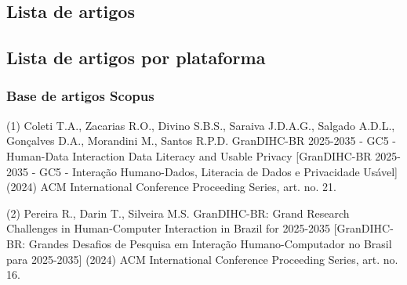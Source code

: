 \documentclass[
	12pt,				%
	oneside,			%
	a4paper,			%
	english,			%
	brazil				%
	]{abntex2ppgsi}
\begin{document}

\begin{apendicesenv}

\partapendices


\chapter{Lista de artigos}\label{Apendice_A}
\section*{Lista de artigos por plataforma}

\subsection{Base de artigos Scopus}\label{list:scopus}

(1) Coleti T.A., Zacarias R.O., Divino S.B.S., Saraiva J.D.A.G., Salgado A.D.L., Gonçalves D.A., Morandini M., Santos R.P.D. GranDIHC-BR 2025-2035 - GC5 - Human-Data Interaction Data Literacy and Usable Privacy [GranDIHC-BR 2025-2035 - GC5 - Interação Humano-Dados, Literacia de Dados e Privacidade Usável]
(2024) ACM International Conference Proceeding Series, art. no. 21.

(2) Pereira R., Darin T., Silveira M.S. GranDIHC-BR: Grand Research Challenges in Human-Computer Interaction in Brazil for 2025-2035 [GranDIHC-BR: Grandes Desafios de Pesquisa em Interação Humano-Computador no Brasil para 2025-2035] (2024) ACM International Conference Proceeding Series, art. no. 16.


\end{apendicesenv}
\end{document}
